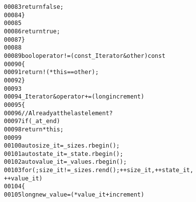 \begin{footnotesize}
\begin{alltt}
00083                                 \textcolor{keywordflow}{return} \textcolor{keyword}{false};
00084                         \}
00085 
00086                         \textcolor{keywordflow}{return} \textcolor{keyword}{true};
00087                     \}
00088 
00089                     \textcolor{keywordtype}{bool} operator!= (\textcolor{keyword}{const} \_Iterator& other)\textcolor{keyword}{ const}
00090 \textcolor{keyword}{                    }\{
00091                         \textcolor{keywordflow}{return} !(*\textcolor{keyword}{this} == other);
00092                     \}
00093 
00094                     \_Iterator & operator+= (\textcolor{keywordtype}{long} increment)
00095                     \{
00096                         \textcolor{comment}{// Already at the last element?}
00097                         \textcolor{keywordflow}{if} (\_at\_end)
00098                             \textcolor{keywordflow}{return} *\textcolor{keyword}{this};
00099 
00100                         \textcolor{keyword}{auto} size\_it = \_sizes.rbegin();
00101                         \textcolor{keyword}{auto} state\_it = \_state.rbegin();
00102                         \textcolor{keyword}{auto} value\_it = \_values.rbegin();
00103                         \textcolor{keywordflow}{for} ( ; size\_it != \_sizes.rend(); ++size\_it, ++state\_it, 
      ++value\_it)
00104                         \{
00105                             \textcolor{keywordtype}{long} new\_value = (*value\_it + increment) % *size\_it;;
      

\end{alltt}
\end{footnotesize}
